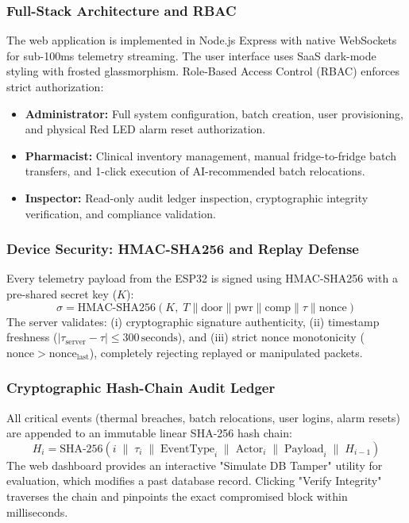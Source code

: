 \documentclass[11pt,a4paper]{article}
\begin{document}
\subsubsection{Full-Stack Architecture and RBAC}
The web application is implemented in Node.js Express with native WebSockets for sub-100ms telemetry streaming. The user interface uses SaaS dark-mode styling with frosted glassmorphism. Role-Based Access Control (RBAC) enforces strict authorization:
\begin{itemize}[leftmargin=2em]
    \item \textbf{Administrator:} Full system configuration, batch creation, user provisioning, and physical Red LED alarm reset authorization.
    \item \textbf{Pharmacist:} Clinical inventory management, manual fridge-to-fridge batch transfers, and 1-click execution of AI-recommended batch relocations.
    \item \textbf{Inspector:} Read-only audit ledger inspection, cryptographic integrity verification, and compliance validation.
\end{itemize}

\subsubsection{Device Security: HMAC-SHA256 and Replay Defense}
Every telemetry payload from the ESP32 is signed using HMAC-SHA256 with a pre-shared secret key ($K$):
\begin{equation}
    \sigma = \text{HMAC-SHA256}(K, \; T \parallel \text{door} \parallel \text{pwr} \parallel \text{comp} \parallel \tau \parallel \text{nonce})
\end{equation}
The server validates: (i) cryptographic signature authenticity, (ii) timestamp freshness ($|\tau_{\text{server}} - \tau| \le 300\,\text{seconds}$), and (iii) strict nonce monotonicity ($\text{nonce} > \text{nonce}_{\text{last}}$), completely rejecting replayed or manipulated packets.

\subsubsection{Cryptographic Hash-Chain Audit Ledger}
All critical events (thermal breaches, batch relocations, user logins, alarm resets) are appended to an immutable linear SHA-256 hash chain:
\begin{equation}
    H_i = \text{SHA-256}\left(i \;\|\; \tau_i \;\|\; \text{EventType}_i \;\|\; \text{Actor}_i \;\|\; \text{Payload}_i \;\|\; H_{i-1}\right)
\end{equation}
The web dashboard provides an interactive "Simulate DB Tamper" utility for evaluation, which modifies a past database record. Clicking "Verify Integrity" traverses the chain and pinpoints the exact compromised block within milliseconds.
\end{document}
